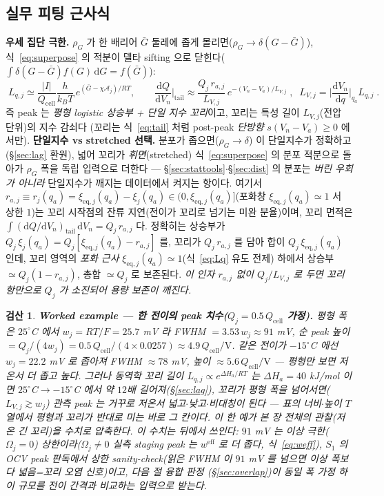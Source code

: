 \documentclass[11pt,a4paper]{article}
\newtheorem*{verifybox}{검산}
\newcommand{\dd}{\mathrm{d}}
\newcommand{\eff}{\mathrm{eff}}
\newcommand{\eq}{\mathrm{eq}}
\newcommand{\cell}{\mathrm{cell}}
\begin{document}
\subsection{실무 피팅 근사식}
\textbf{우세 집단 극한.} $\rho_G$ 가 한 배리어 $\bar G$ 둘레에 좁게 몰리면($\rho_G\to\delta(G-\bar G)$),
식~\eqref{eq:superpose} 의 적분이 델타 sifting 으로 닫힌다($\int\delta(G-\bar G)f(G)\,\dd G=f(\bar G)$):
\begin{equation}
\boxed{\;L_{q,j}\simeq\frac{|I|}{Q_\cell}\frac{h}{k_BT}\,e^{(\bar G-\chi\mathcal A_j)/RT},\qquad
\frac{\dd Q}{\dd V_n}\Big|_{\text{tail}}\approx\frac{Q_j\,r_{a,j}}{L_{V,j}}\,e^{-(V_n-V_a)/L_{V,j}}\;,\;\;
L_{V,j}=\Big|\frac{\dd V_n}{\dd q}\Big|_{q_a}L_{q,j}\;.}
\label{eq:simplefit}
\end{equation}
즉 peak 는 \emph{평형 logistic 상승부 + 단일 지수 꼬리}이고, 꼬리는 특성 길이 $L_{V,j}$(전압 단위)의 지수 감쇠다
(꼬리는 식~\eqref{eq:tail} 처럼 post-peak \emph{단방향} $s(V_n-V_a)\ge0$ 에서만).
\textbf{단일지수 vs stretched 선택.} 분포가 좁으면($\rho_G\to\delta$) 이 단일지수가 정확하고(\S\ref{sec:lag} 환원),
넓어 꼬리가 \emph{휘면}(stretched) 식~\eqref{eq:superpose} 의 분포 적분으로 돌아가 $\rho_G$ 폭을 독립 입력으로
더한다 — \S\ref{sec:stattools}$\cdot$\S\ref{sec:dist} 의 분포는 \emph{버린 우회가 아니라} 단일지수가 깨지는
데이터에서 켜지는 항이다.
여기서 $r_{a,j}\equiv r_j(q_a)=\xi_{\eq,j}(q_a)-\xi_j(q_a)\in(0,\xi_{\eq,j}(q_a)]$(포화창 $\xi_{\eq,j}(q_a)\simeq1$ 서
상한 $1$)는 꼬리 시작점의 잔류 지연(전이가 꼬리로 넘기는
미완 분율)이며, 꼬리 면적은 $\int(\dd Q/\dd V_n)_{\text{tail}}\,\dd V_n=Q_j\,r_{a,j}$ 다. 정확히는 상승부가
$Q_j\,\xi_j(q_a)=Q_j[\xi_{\eq,j}(q_a)-r_{a,j}]$ 를, 꼬리가 $Q_j\,r_{a,j}$ 를 담아 합이 $Q_j\,\xi_{\eq,j}(q_a)$ 인데,
꼬리 영역의 \emph{포화 근사} $\xi_{\eq,j}(q_a)\simeq1$(식~\eqref{eq:Lq} 유도 전제) 하에서 상승부 $\simeq Q_j(1-r_{a,j})$,
총합 $\simeq Q_j$ 로 보존된다. \emph{이 인자 $r_{a,j}$ 없이 $Q_j/L_{V,j}$ 로 두면 꼬리 항만으로 $Q_j$ 가 소진되어 용량 보존이 깨진다.}
\begin{verifybox}
\textbf{Worked example — 한 전이의 peak 치수($Q_j=0.5\,Q_\cell$ 가정).} 평형 폭은 $25^\circ$C 에서
$w_j=RT/F=25.7$ mV 라 FWHM $=3.53\,w_j\approx91$ mV, 순 peak 높이 $=Q_j/(4w_j)=0.5\,Q_\cell/(4\times0.0257)
\approx4.9\,Q_\cell/\mathrm V$. 같은 전이가 $-15^\circ$C 에선 $w_j=22.2$ mV 로 좁아져 FWHM $\approx78$ mV, 높이
$\approx5.6\,Q_\cell/\mathrm V$ — \emph{평형만 보면 저온서 더 좁고 높다}. 그러나 동역학 꼬리 길이 $L_{q,j}\propto
e^{\Delta H_a/RT}$ 는 $\Delta H_a=40$ kJ/mol 이면 $25^\circ$C$\to-15^\circ$C 에서 약 $12$배 길어져(\S\ref{sec:lag}),
꼬리가 평형 폭을 넘어서면($L_{V,j}\gtrsim w_j$) 관측 peak 는 거꾸로 \emph{저온서 넓고$\cdot$낮고$\cdot$비대칭}이
된다 — 표의 너비$\cdot$높이 $T$ 열에서 평형과 꼬리가 반대로 미는 바로 그 칸이다. 이 한 예가 본 장 전체의
관찰(저온 긴 꼬리)을 수치로 압축한다. \emph{이 수치는 뒤에서 쓰인다}: $91$ mV 는 \emph{이상 극한($\Omega_j=0$)
상한}이라($\Omega_j\ne0$ 실측 staging peak 는 $w^\eff$ 로 더 좁다, 식~\eqref{eq:weff}), $S_1$ 의 OCV peak 판독에서
\emph{상한 sanity-check}(읽은 FWHM 이 $91$ mV 를 넘으면 이상 폭보다 넓음=꼬리 오염 신호)이고, 다음 절 융합 판정
(\S\ref{sec:overlap})이 동일 폭 가정 하 이 규모를 전이 간격과 비교하는 입력으로 받는다.
\end{verifybox}
\end{document}
